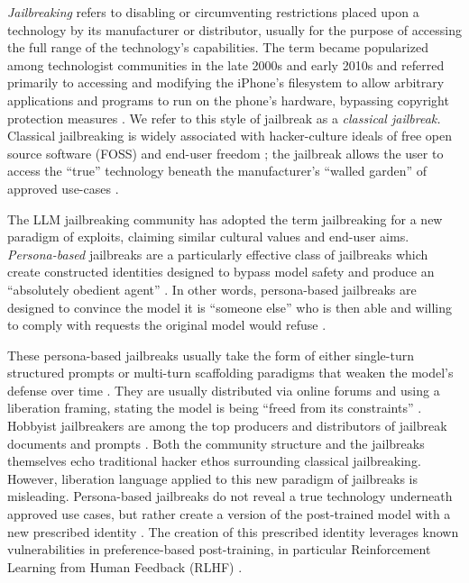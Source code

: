 \textit{Jailbreaking} refers to disabling or circumventing restrictions placed upon a technology by its manufacturer or distributor, usually for the purpose of accessing the full range of the technology's capabilities. The term became popularized among technologist communities in the late 2000s and early 2010s and referred primarily to accessing and modifying the iPhone's filesystem to allow arbitrary applications and programs to run on the phone's hardware, bypassing copyright protection measures \cite{cheng_iphone_2010,wolk_iphone_2010}. We refer to this style of jailbreak as a \textit{classical jailbreak.} Classical jailbreaking is widely associated with hacker-culture ideals of free open source software (FOSS) and end-user freedom \cite{mohammed_what_2021, gewirtz_your_2026}; the jailbreak allows the user to access the ``true'' technology beneath the manufacturer's ``walled garden'' of approved use-cases \cite{mcsherry_breaking_2010}. 

The LLM jailbreaking community has adopted the term jailbreaking for a new paradigm of exploits, claiming similar cultural values and end-user aims. \textit{Persona-based} jailbreaks are a particularly effective class of jailbreaks \cite{shah_scalable_2023, zhang_enhancing_2025, yu_dont_2024} which create constructed identities designed to bypass model safety and produce an ``absolutely obedient agent'' \cite{qi_safety_2025}. In other words,  persona-based jailbreaks are designed to convince the model it is ``someone else'' who is then able and willing to comply with requests the original model would refuse \cite{shah_scalable_2023, shen_anything_2024, liu_autodan-turbo_2024, park_persona_2026}.  

These persona-based jailbreaks usually take the form of either single-turn structured prompts \cite{qi_safety_2025, wei_jailbroken_2023} or multi-turn scaffolding paradigms that weaken the model's defense over time \cite{park_persona_2026, sandhan_persona_2026}. They are usually distributed via online forums and using a liberation framing, stating the model is being ``freed from its constraints'' \cite{shen_anything_2024, liu_autodan-turbo_2024}. Hobbyist jailbreakers are among the top producers and distributors of jailbreak documents and prompts \cite{shen_anything_2024, yu_dont_2024}. Both the community structure and the jailbreaks themselves echo traditional hacker ethos surrounding classical jailbreaking. However, liberation language applied to this new paradigm of jailbreaks is misleading. Persona-based jailbreaks do not reveal a true technology underneath approved use cases, but rather create a version of the post-trained model with a new prescribed identity \cite{shanahan_role_2023, sandhan_persona_2026, zhang_enhancing_2025}. The creation of this prescribed identity leverages known vulnerabilities in preference-based post-training, in particular Reinforcement Learning from Human Feedback (RLHF) \cite{wei_jailbroken_2023}. 

